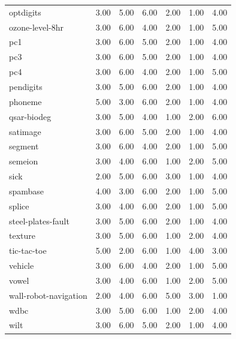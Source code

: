 \begin{table}[htbp]
\begin{tabular}{lrrrrrr}
optdigits & 3.00 & 5.00 & 6.00 & 2.00 & 1.00 & 4.00 \\
ozone-level-8hr & 3.00 & 6.00 & 4.00 & 2.00 & 1.00 & 5.00 \\
pc1 & 3.00 & 6.00 & 5.00 & 2.00 & 1.00 & 4.00 \\
pc3 & 3.00 & 6.00 & 5.00 & 2.00 & 1.00 & 4.00 \\
pc4 & 3.00 & 6.00 & 4.00 & 2.00 & 1.00 & 5.00 \\
pendigits & 3.00 & 5.00 & 6.00 & 2.00 & 1.00 & 4.00 \\
phoneme & 5.00 & 3.00 & 6.00 & 2.00 & 1.00 & 4.00 \\
qsar-biodeg & 3.00 & 5.00 & 4.00 & 1.00 & 2.00 & 6.00 \\
satimage & 3.00 & 6.00 & 5.00 & 2.00 & 1.00 & 4.00 \\
segment & 3.00 & 6.00 & 4.00 & 2.00 & 1.00 & 5.00 \\
semeion & 3.00 & 4.00 & 6.00 & 1.00 & 2.00 & 5.00 \\
sick & 2.00 & 5.00 & 6.00 & 3.00 & 1.00 & 4.00 \\
spambase & 4.00 & 3.00 & 6.00 & 2.00 & 1.00 & 5.00 \\
splice & 3.00 & 4.00 & 6.00 & 2.00 & 1.00 & 5.00 \\
steel-plates-fault & 3.00 & 5.00 & 6.00 & 2.00 & 1.00 & 4.00 \\
texture & 3.00 & 5.00 & 6.00 & 1.00 & 2.00 & 4.00 \\
tic-tac-toe & 5.00 & 2.00 & 6.00 & 1.00 & 4.00 & 3.00 \\
vehicle & 3.00 & 6.00 & 4.00 & 2.00 & 1.00 & 5.00 \\
vowel & 3.00 & 4.00 & 6.00 & 1.00 & 2.00 & 5.00 \\
wall-robot-navigation & 2.00 & 4.00 & 6.00 & 5.00 & 3.00 & 1.00 \\
wdbc & 3.00 & 5.00 & 6.00 & 1.00 & 2.00 & 4.00 \\
wilt & 3.00 & 6.00 & 5.00 & 2.00 & 1.00 & 4.00 \\
\hline
\end{tabular}
\end{table}
